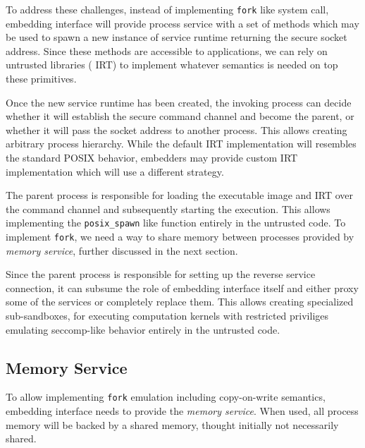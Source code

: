 
To address these challenges, instead of implementing \lstinline`fork`
like system call, embedding interface will provide process service  with
a set of methods which may be used to spawn a new instance of
service runtime returning the secure socket address. Since these methods
are accessible to applications, we can rely on untrusted libraries (\eg
IRT) to implement whatever semantics is needed on top these primitives.

Once the new service runtime has been created, the invoking process can
decide whether it will establish the secure command channel and become
the parent, or whether it will pass the socket address to another
process.  This allows creating arbitrary process hierarchy.  While the
default IRT implementation will resembles the standard POSIX behavior,
embedders may provide custom IRT implementation which will use a
different strategy.

The parent process is responsible for loading the executable image and
IRT over the command channel and subsequently starting the execution.
This allows implementing the \lstinline`posix_spawn` like function
entirely in the untrusted code. To implement \lstinline`fork`, we need a
way to share memory between processes provided by \emph{memory service},
further discussed in the next section.

Since the parent process is responsible for setting up the reverse
service connection, it can subsume the role of embedding interface itself
and either proxy some of the services or completely replace them. This
allows creating specialized sub-sandboxes, \eg for executing computation
kernels with restricted priviliges emulating seccomp-like behavior
entirely in the untrusted code.

\subsection{Memory Service}
\label{sub:memory_service}


To allow implementing \lstinline`fork` emulation including copy-on-write
semantics, embedding interface needs to provide the \emph{memory
service}. When used, all process memory will be backed by a shared
memory, thought initially not necessarily shared.

